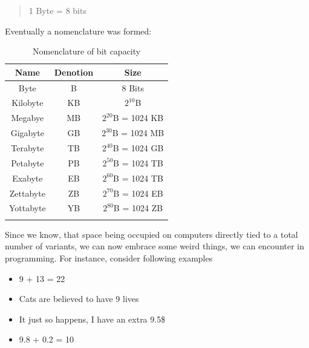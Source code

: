 \documentclass{article}
\begin{document}
            \begin{quote}
                \begin{center}
                    1 Byte = 8 bits                                    
                \end{center}
            \end{quote}

            Eventually a nomenclature was formed: 


            \begin{table}[h]
                \centering
                \begin{longtable}{|c|c|c|}
                    \hline
                    Name & Denotion & Size \\\hline
                    Byte & B & 8 Bits \\\hline
                    Kilobyte & KB & $2^{10}$B \\\hline
                    Megabye & MB & $2^{20}$B = 1024 KB \\\hline
                    Gigabyte & GB & $2^{30}$B = 1024 MB \\\hline
                    Terabyte & TB & $2^{40}$B = 1024 GB \\\hline
                    Petabyte & PB & $2^{50}$B = 1024 TB \\\hline
                    Exabyte & EB & $2^{60}$B = 1024 TB \\\hline
                    Zettabyte & ZB & $2^{70}$B = 1024 EB \\\hline
                    Yottabyte & YB & $2^{80}$B = 1024 ZB \\\hline
                    
                    \caption{Nomenclature of bit capacity}
                \end{longtable}
            \end{table}

            Since we know, that space being occupied on computers directly tied to a total number of variants, we can now embrace some weird things, we can encounter
            in programming. For instance, consider following examples

            \begin{itemize}
                \item 9 + 13 = 22
                \item Cats are believed to have 9 lives
                \item It just so happens, I have an extra 9.5\$
                \item 9.8 + 0.2 = 10
            \end{itemize}
\end{document}
